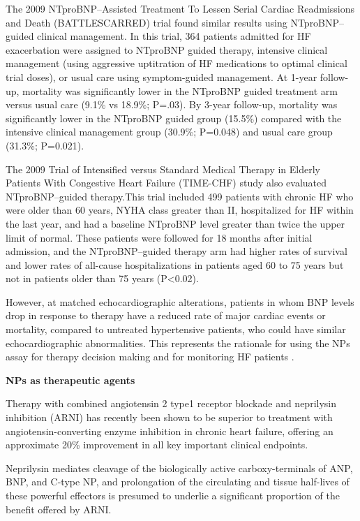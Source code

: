 \documentclass[14pt,a4paper,onecolumn]{extarticle}
\begin{document}
The 2009 NTproBNP–Assisted Treatment To Lessen Serial Cardiac Readmissions and Death (BATTLESCARRED) trial found similar results using NTproBNP–guided clinical management. In this trial, 364 patients admitted for HF exacerbation were assigned to NTproBNP guided therapy, intensive clinical management (using aggressive uptitration of HF medications to optimal clinical trial doses), or usual care using symptom-guided management. At 1-year follow-up, mortality was significantly lower in the NTproBNP guided treatment arm versus usual care (9.1\% vs 18.9\%; P=.03). By 3-year follow-up, mortality was significantly lower in the NTproBNP guided group (15.5\%) compared with the intensive clinical management group (30.9\%; P=0.048) and usual care group (31.3\%; P=0.021). \citep{Lainchbury2009} %

The 2009 Trial of Intensified versus Standard Medical Therapy in Elderly Patients With Congestive Heart Failure (TIME-CHF) study also evaluated NTproBNP–guided therapy.This trial included 499 patients with chronic HF who were older than 60 years, NYHA class greater than II, hospitalized for HF within the last year, and had a baseline NTproBNP level greater than twice the upper limit of normal. These patients were followed for 18 months after initial admission, and the NTproBNP–guided therapy arm had higher rates of survival and lower rates of all-cause hospitalizations in patients aged 60 to 75 years but not in patients older than 75 years (P<0.02). \citep{Pfisterer2009} %

However, at matched echocardiographic alterations, patients in whom BNP levels drop in response to therapy have a reduced rate of major cardiac events or mortality, compared to untreated hypertensive patients, who could have similar echocardiographic abnormalities. This represents the rationale for using the NPs assay for therapy decision making and for monitoring HF patients \citep{bib35} \citep{bib363} \citep{bib364}.

	\textbf{NPs as therapeutic agents}

Therapy with combined angiotensin 2 type1 receptor blockade and neprilysin inhibition (ARNI) has recently been shown to be superior to treatment with angiotensin-converting enzyme inhibition in chronic heart failure, offering an approximate 20\% improvement in all key important clinical endpoints. \citep{McMurray2014}

Neprilysin mediates cleavage of the biologically active carboxy-terminals of ANP, BNP, and C-type NP, and prolongation of the circulating and tissue half-lives of these powerful effectors is presumed to underlie a significant proportion of the benefit offered by ARNI. \citep{Bayes-Genis2016}
\end{document}

